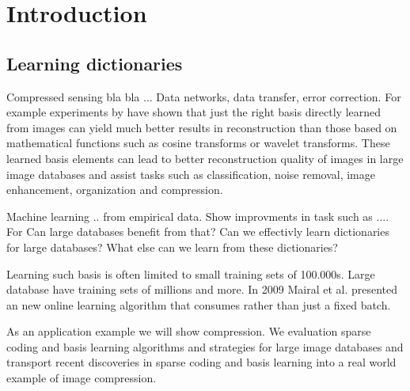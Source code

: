 \chapter{Introduction}
\label{sec:introduction}
\section{Learning dictionaries}


Compressed sensing bla bla ...
Data networks, data transfer, error correction. For example experiments by
\cite{} have shown that just the right basis directly learned from images can
yield much better results in reconstruction than those based on mathematical
functions such as cosine transforms or wavelet\cite{Elad2006,Mairal2010}
transforms. These learned basis elements can lead to better reconstruction
quality of images in large image databases and assist tasks such as
classification, noise removal, image enhancement, organization and compression. 

Machine learning .. from empirical data.
Show improvments in task such as ....
For 
Can large databases benefit from that? Can we effectivly learn dictionaries for
large databases? What else can we learn from these dictionaries?



Learning such basis is often limited to small training sets of 100.000s. Large
database have training sets of millions and more.
In 2009 Mairal et al.\cite{Mairal2009} presented an new online learning
algorithm that consumes rather than just a fixed batch. 

As an application example we will show compression. We evaluation sparse coding
and basis learning algorithms and strategies for large image databases and
transport recent discoveries in sparse coding and basis learning into a real
world example of image compression.

